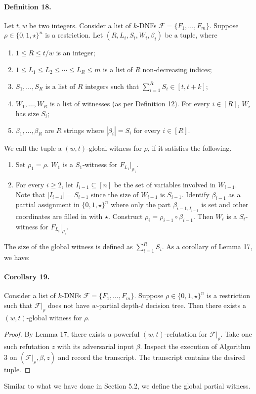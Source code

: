 \paragraph{Definition 18.} Let $t,w$ be two integers. Consider a list of $k$-DNFs $\mathcal F=\{F_1,\ldots,F_m\}$. Suppose $\rho\in\{0,1,\star\}^n$ is a restriction. Let $(R,L_i,S_i,W_i,\beta_i)$ be a tuple, where
\begin{enumerate}\item $1\le R\le t/w$ is an integer;
\item $1\le L_1\le L_2\le\cdots\le L_R\le m$ is a list of $R$ non-decreasing indices;
\item $S_1,\ldots,S_R$ is a list of $R$ integers such that $\sum_{i=1}^RS_i\in[t,t+k]$;
\item $W_1,\ldots,W_R$ is a list of witnesses (as per Definition 12). For every $i\in[R]$, $W_i$ has size $S_i$;
\item $\beta_1,\ldots,\beta_R$ are $R$ strings where $|\beta_i|=S_i$ for every $i\in[R]$.\end{enumerate}
We call the tuple a $(w,t)$-global witness for $\rho$, if it satisfies the following.
\begin{enumerate}\item Set $\rho_1=\rho$. $W_1$ is a $S_1$-witness for $F_{L_1}|_{\rho_1}$.
\item For every $i\ge2$, let $I_{i-1}\subseteq[n]$ be the set of variables involved in $W_{i-1}$. Note that $|I_{i-1}|=S_{i-1}$ since the size of $W_{i-1}$ is $S_{i-1}$. Identify $\beta_{i-1}$ as a partial assignment in $\{0,1,\star\}^n$ where only the part $\beta_{i-1,I_{i-1}}$ is set and other coordinates are filled in with $\star$. Construct $\rho_i=\rho_{i-1}\circ\beta_{i-1}$. Then $W_i$ is a $S_i$-witness for $F_{L_i}|_{\rho_i}$.\end{enumerate}
The size of the global witness is defined as $\sum_{i=1}^RS_i$. As a corollary of Lemma 17, we have:
\paragraph{Corollary 19.} Consider a list of $k$-DNFs $\mathcal F=\{F_1,\ldots,F_m\}$. Suppose $\rho\in\{0,1,\star\}^n$ is a restriction such that $\mathcal F|_\rho$ does not have $w$-partial depth-$t$ decision tree. Then there exists a $(w,t)$-global witness for $\rho$.
\begin{proof}By Lemma 17, there exists a powerful $(w,t)$-refutation for $\mathcal F|_\rho$. Take one such refutation $z$ with its adversarial input $\beta$. Inspect the execution of Algorithm 3 on $(\mathcal F|_\rho,\beta,z)$ and record the transcript. The transcript contains the desired tuple.\end{proof}
Similar to what we have done in Section 5.2, we define the global partial witness.
